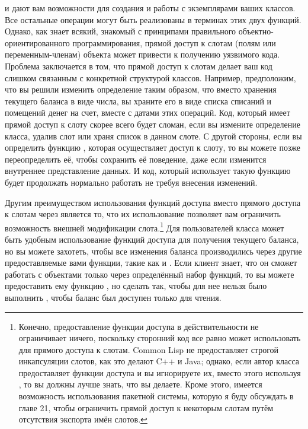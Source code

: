  и  дают вам возможности для создания и работы с
экземплярами ваших классов.  Все остальные операции могут быть реализованы в терминах этих
двух функций.  Однако, как знает всякий, знакомый с принципами правильного
объектно-ориентированного программирования, прямой доступ к слотам (полям или
переменным-членам) объекта может привести к получению уязвимого кода.  Проблема
заключается в том, что прямой доступ к слотам делает ваш код слишком связанным с
конкретной структурой классов.  Например, предположим, что вы решили изменить определение
 таким образом, что вместо хранения текущего баланса в виде числа, вы
храните его в виде списка списаний и помещений денег на счет, вместе с датами этих
операций.  Код, который имеет прямой доступ к слоту  скорее всего будет
сломан, если вы измените определение класса, удалив слот или храня список в данном
слоте. С другой стороны, если вы определить функцию , которая осуществляет
доступ к слоту, то вы можете позже переопределить её, чтобы сохранить её поведение, даже
если изменится внутреннее представление данных.  И код, который использует такую функцию
будет продолжать нормально работать не требуя внесения изменений.

Другим преимуществом использования функций доступа вместо прямого доступа к слотам через
 является то, что их использование позволяет вам ограничить возможность
внешней модификации слота.\footnote{Конечно, предоставление функции доступа в
  действительности не ограничивает ничего, поскольку сторонний код все равно может
  использовать  для прямого доступа к слотам. Common Lisp не
  предоставляет строгой инкапсуляции слотов, как это делают C++ и Java; однако, если автор
  класса предоставляет функции доступа и вы игнорируете их, вместо этого используя
  , то вы должны лучше знать, что вы делаете.  Кроме этого, имеется
  возможность использования пакетной системы, которую я буду обсуждать в главе 21, чтобы
  ограничить прямой доступ к некоторым слотам путём отсутствия экспорта имён слотов.} Для
пользователей класса  может быть удобным использование функций доступа
для получения текущего баланса, но вы можете захотеть, чтобы все изменения баланса
производились через другие предоставляемые вами функции, такие как  и
.  Если клиент знает, что он сможет работать с объектами только через
определённый набор функций, то вы можете предоставить ему функцию , но
сделать так, чтобы для нее нельзя было выполнить , чтобы баланс был доступен
только для чтения.

